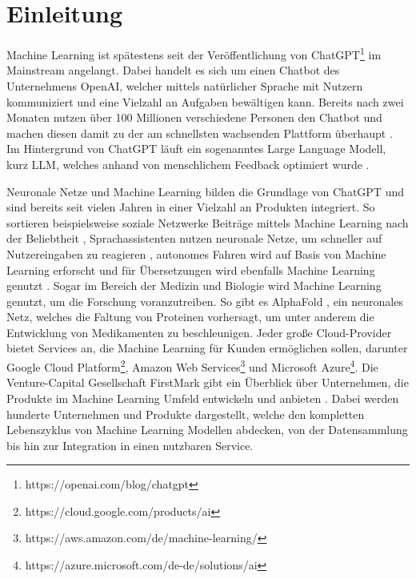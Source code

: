 \chapter{Einleitung}\label{sec:introduction}

Machine Learning ist spätestens seit der Veröffentlichung von ChatGPT\footnote{https://openai.com/blog/chatgpt} im Mainstream angelangt. 
Dabei handelt es sich um einen Chatbot des Unternehmens OpenAI, welcher mittels natürlicher Sprache mit Nutzern kommuniziert und eine Vielzahl an Aufgaben bewältigen kann.
Bereits nach zwei Monaten nutzen über 100 Millionen verschiedene Personen den Chatbot und machen diesen damit zu der am schnellsten wachsenden Plattform überhaupt \cite{I-1}.
Im Hintergrund von ChatGPT läuft ein sogenanntes Large Language Modell, kurz LLM, welches anhand von menschlichem Feedback optimiert wurde \cite{P-84}. 

Neuronale Netze und Machine Learning bilden die Grundlage von ChatGPT und sind bereits seit vielen Jahren in einer Vielzahl an Produkten integriert.
So sortieren beispielsweise soziale Netzwerke Beiträge mittels Machine Learning nach der Beliebtheit \cite{twitter_algo}, Sprachassistenten nutzen neuronale Netze, um schneller auf Nutzereingaben zu reagieren \cite{siri}, autonomes Fahren wird auf Basis von Machine Learning erforscht \cite{openpilot} und für Übersetzungen wird ebenfalls Machine Learning genutzt \cite{translation}.
Sogar im Bereich der Medizin und Biologie wird Machine Learning genutzt, um die Forschung voranzutreiben. 
So gibt es AlphaFold \cite{AlphaFold}, ein neuronales Netz, welches die Faltung von Proteinen vorhersagt, um unter anderem die Entwicklung von Medikamenten zu beschleunigen.
Jeder große Cloud-Provider bietet Services an, die Machine Learning für Kunden ermöglichen sollen, darunter Google Cloud Platform\footnote{https://cloud.google.com/products/ai}, Amazon Web Services\footnote{https://aws.amazon.com/de/machine-learning/} und Microsoft Azure\footnote{https://azure.microsoft.com/de-de/solutions/ai}.
Die Venture-Capital Gesellschaft FirstMark gibt ein Überblick über Unternehmen, die Produkte im Machine Learning Umfeld entwickeln und anbieten \cite{I-4}. 
Dabei werden hunderte Unternehmen und Produkte dargestellt, welche den kompletten Lebenszyklus von Machine Learning Modellen abdecken, von der Datensammlung bis hin zur Integration in einen nutzbaren Service.

